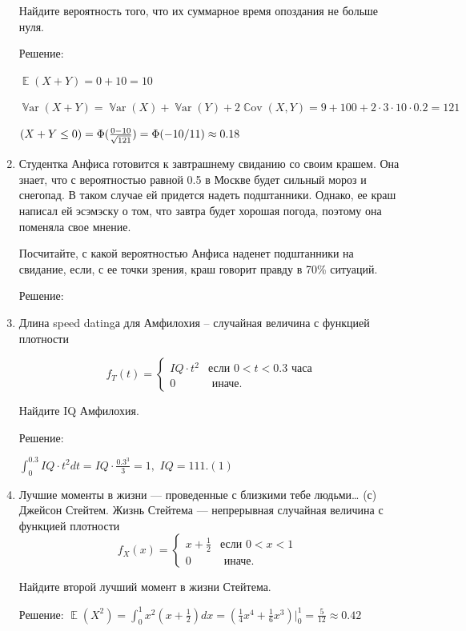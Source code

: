 \documentclass[12pt]{article}
\let\P\relax
\DeclareMathOperator{\P}{\mathbb{P}}
\DeclareMathOperator{\E}{\mathbb{E}}
\DeclareMathOperator{\Var}{\mathbb{V}ar}
\DeclareMathOperator{\Cov}{\mathbb{C}ov}
\begin{document}
\begin{enumerate}
Найдите вероятность того, что их суммарное время опоздания не больше нуля. %

Решение:

$\E(X+Y) = 0 + 10 = 10$

$\Var(X+Y) = \Var(X) + \Var(Y) + 2 \Cov(X, Y) = 9 + 100 + 2 \cdot 3 \cdot 10 \cdot 0.2 = 121$

$\P(X+Y \leq 0) = \Phi(\frac{0-10}{\sqrt{121}}) = \Phi(-10/11) \approx 0.18$


\item Студентка Анфиса готовится к завтрашнему свиданию со своим крашем.
Она знает, что с вероятностью равной 0.5 в Москве будет сильный мороз и снегопад. 
В таком случае ей придется надеть подштанники. 
Однако, ее краш написал ей эсэмэску о том, что завтра будет хорошая погода, поэтому она поменяла свое мнение. 

Посчитайте, с какой вероятностью Анфиса наденет подштанники на свидание, если, с ее точки зрения, краш говорит правду в 70\%  ситуаций.

Решение:

\item  Длина speed datingа для Амфилохия -- случайная величина с функцией плотности 

\begin{equation*}
f_T(t) = 
 \begin{cases}
   IQ \cdot t^2 &\text{если $0 < t < 0.3$ часа}\\
   0 &\text{ иначе. }
 \end{cases}
\end{equation*}

Найдите IQ Амфилохия.

Решение:

$\int_0^{0.3} IQ \cdot t^2  dt = IQ \cdot \frac{0.3^3}{3} = 1, $
$IQ = 111.(1)$

\item 
Лучшие моменты в жизни — проведенные с близкими тебе людьми… (с) Джейсон Стейтем. 
Жизнь Стейтема — непрерывная случайная величина с функцией плотности
\[
f_X(x) = 
 \begin{cases}
   x + \frac{1}{2} &\text{если $0 < x < 1$ }\\
   0 &\text{ иначе. }
 \end{cases}
\]

Найдите второй лучший момент в жизни Стейтема.

Решение:
$\E(X^2) = \int_0^1 x^2 (x + \frac{1}{2}) dx = (\frac{1}{4} x^4 + \frac{1}{6} x^3)|_0^1 = \frac{5}{12} \approx 0.42$
\end{enumerate}
\end{document}
